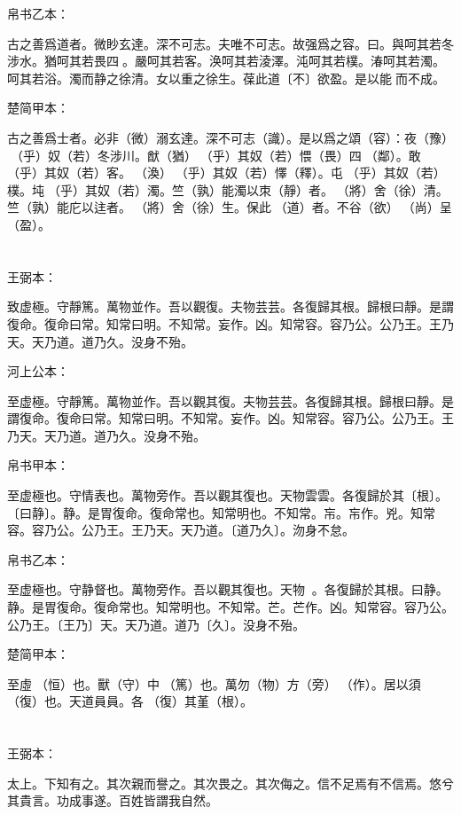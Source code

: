\documentclass[a5paper]{ctexbook}
\begin{document}
    帛书乙本：

    古之善爲道者。微眇玄達。深不可志。夫唯不可志。故强爲之容。曰。與呵其若冬涉水。猶呵其若畏四𠳵。嚴呵其若客。涣呵其若淩澤。沌呵其若樸。湷呵其若濁。𣼥呵其若浴。濁而静之徐清。女以重之徐生。葆此道〔不〕欲盈。是以能𧝬而不成。

    楚简甲本：

    古之善爲士者。必非（微）溺玄達。深不可志（識）。是以爲之頌（容）：夜（豫）󶴋（乎）奴（若）冬涉川。猷（猶）󶴋（乎）其奴（若）愄（畏）四𠳵（鄰）。敢󶴋（乎）其奴（若）客。󶴝（渙）󶴋（乎）其奴（若）懌（釋）。屯󶴋（乎）其奴（若）樸。坉󶴋（乎）其奴（若）濁。竺（孰）能濁以朿（靜）者。𨟻（將）舍（徐）清。竺（孰）能庀以迬者。𨟻（將）舍（徐）生。保此𧗟（道）者。不谷（欲）󶴞（尚）呈（盈）。

    \chapter{}
    王弼本：

    致虚極。守靜篤。萬物並作。吾以觀復。夫物芸芸。各復歸其根。歸根曰靜。是謂復命。復命曰常。知常曰明。不知常。妄作。凶。知常容。容乃公。公乃王。王乃天。天乃道。道乃久。没身不殆。

    河上公本：

    至虚極。守靜篤。萬物並作。吾以觀其復。夫物芸芸。各復歸其根。歸根曰靜。是謂復命。復命曰常。知常曰明。不知常。妄作。凶。知常容。容乃公。公乃王。王乃天。天乃道。道乃久。没身不殆。

    帛书甲本：

    至虚極也。守情表也。萬物旁作。吾以觀其復也。天物雲雲。各復歸於其〔根〕。〔曰静〕。静。是胃復命。復命常也。知常明也。不知常。㠵。㠵作。兇。知常容。容乃公。公乃王。王乃天。天乃道。〔道乃久〕。沕身不怠。

    帛书乙本：

    至虚極也。守静督也。萬物旁作。吾以觀其復也。天物𥘟𥘟。各復歸於其根。曰静。静。是胃復命。復命常也。知常明也。不知常。芒。芒作。凶。知常容。容乃公。公乃王。〔王乃〕天。天乃道。道乃〔久〕。没身不殆。

    楚简甲本：

    至虛𠄨（恒）也。獸（守）中󶴮（篤）也。萬勿（物）方（旁）󶴮（作）。居以須󵯿（復）也。天道員員。各󵯿（復）其堇（根）。

    \chapter{}
    王弼本：

    太上。下知有之。其次親而譽之。其次畏之。其次侮之。信不足焉有不信焉。悠兮其貴言。功成事遂。百姓皆謂我自然。
\end{document}
